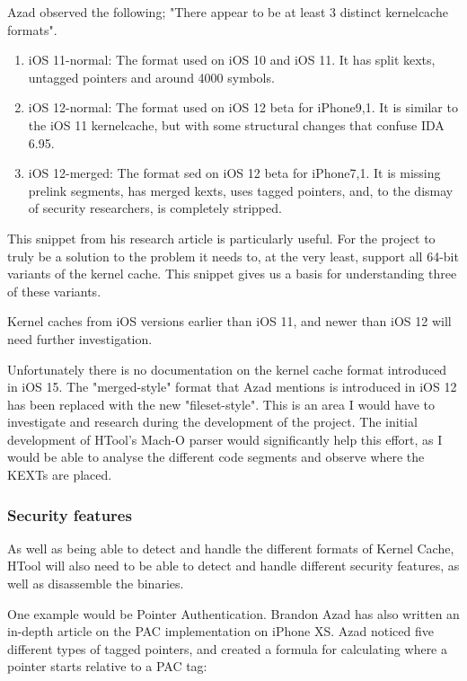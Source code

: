 Azad observed the following; "There appear to be at least 3 distinct kernelcache formats".

\begin{enumerate}
	\item iOS 11-normal: The format used on iOS 10 and iOS 11. It has split kexts, untagged pointers and around 4000 symbols.
	\item iOS 12-normal: The format used on iOS 12 beta for iPhone9,1. It is similar to the iOS 11 kernelcache, but with some structural changes that confuse IDA 6.95.
	\item iOS 12-merged: The format sed on iOS 12 beta for iPhone7,1. It is missing prelink segments, has merged kexts, uses tagged pointers, and, to the dismay of security researchers, is completely stripped.
\end{enumerate}
 
 This snippet from his research article is particularly useful. For the project to truly be a solution to the problem it needs to, at the very least, support all 64-bit variants of the kernel cache. This snippet gives us a basis for understanding three of these variants. 
 
 Kernel caches from iOS versions earlier than iOS 11, and newer than iOS 12 will need further investigation. 
 
 Unfortunately there is no documentation on the kernel cache format introduced in iOS 15. The "merged-style" format that Azad mentions is introduced in iOS 12 has been replaced with the new "fileset-style". This is an area I would have to investigate and research during the development of the project. The initial development of HTool's Mach-O parser would significantly help this effort, as I would be able to analyse the different code segments and observe where the KEXTs are placed. 

 
 \subsubsection{Security features}
 
 As well as being able to detect and handle the different formats of Kernel Cache, HTool will also need to be able to detect and handle different security features, as well as disassemble the binaries. 
 
 One example would be Pointer Authentication. Brandon Azad has also written an in-depth article on the PAC implementation on iPhone XS\cite{azad-pac-indepth}. Azad noticed five different types of tagged pointers, and created a formula for calculating where a pointer starts relative to a PAC tag:
 
